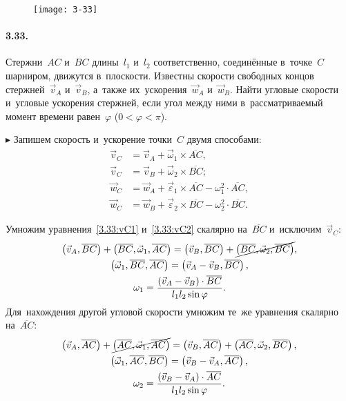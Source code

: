 \documentclass{weekly}
\begin{document}
\begin{wrapfigure}[7]{l}{4.3cm}\vspace{3mm}
    \texttt{[image: 3-33]}
\end{wrapfigure}
\paragraph{3.33.} Стержни~$AC$ и~$BC$ длины~$l_1$ и~$l_2$
соответственно, соединённые в~точке~$C$ шарниром, движутся
в~плоскости. Известны скорости свободных концов стержней~$\vec v_A$
и~$\vec v_B$, а~также их~ускорения~$\vec w_A$ и~$\vec w_B$.
Найти угловые скорости и~угловые ускорения стержней, если
угол между ними в~рассматриваемый момент времени равен~$\varphi$
($0 < \varphi < \pi$).

$\blacktriangleright$ Запишем скорость и~ускорение точки~$C$
двумя способами:
\begin{align}
    \vec v_C &= \vec v_A + \vec\omega_1 \times \overline{AC},
        \label{3.33:vC1}\\
    \vec v_C &= \vec v_B + \vec\omega_2 \times \overline{BC};
        \label{3.33:vC2}\\[1.5ex]
    \vec w_C &= \vec w_A + \vec\varepsilon_1 \times \overline{AC} -
        \omega_1^2 \cdot \overline{AC}, \label{3.33:wC1}\\
    \vec w_C &= \vec w_B + \vec\varepsilon_2 \times \overline{BC} -
        \omega_2^2 \cdot \overline{BC}. \label{3.33:wC2}
\end{align}

Умножим уравнения~\eqref{3.33:vC1} и~\eqref{3.33:vC2} скалярно
на~$\overline{BC}$ и~исключим~$\vec v_C$:
\begin{gather}
    \left(\vec v_A, \overline{BC}\right) +
            \left(\overline{BC}, \vec\omega_1, \overline{AC}\right)
        = \left(\vec v_B, \overline{BC}\right) +
            \cancel{\left(\overline{BC},
            \vec\omega_2, \overline{BC}\right)}, \\
    \left(\vec\omega_1, \overline{BC}, \overline{AC}\right)
        = \left(\vec v_A - \vec v_B, \overline{BC}\right), \\
    \omega_1 = \frac{\left(\vec v_A - \vec v_B\right)\cdot\overline{BC}}
        {l_1 l_2 \sin\varphi}.
\end{gather}
Для~нахождения другой угловой скорости умножим те~же уравнения
скалярно на~$\overline{AC}$:
\begin{gather}
    \left(\vec v_A, \overline{AC}\right) +
            \cancel{\left(\overline{AC},
            \vec\omega_1, \overline{AC}\right)}
        = \left(\vec v_B, \overline{AC}\right) +
            \left(\overline{AC}, \vec\omega_2, \overline{BC}\right), \\
    \left(\vec\omega_1, \overline{AC}, \overline{BC}\right)
        = \left(\vec v_B - \vec v_A, \overline{AC}\right), \\
    \omega_2 = \frac{\left(\vec v_B - \vec v_A\right)\cdot\overline{AC}}
        {l_1 l_2 \sin\varphi}.
\end{gather}
\end{document}
